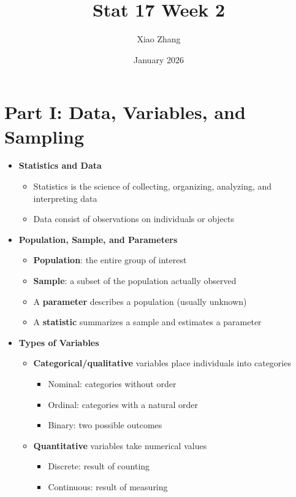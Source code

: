 \documentclass{article}
\title{Stat 17 Week 2}
\author{Xiao Zhang}
\date{January 2026}
\begin{document}
\maketitle

\section*{Part I: Data, Variables, and Sampling}

\begin{itemize}

\item \textbf{Statistics and Data}
\begin{itemize}
  \item Statistics is the science of collecting, organizing, analyzing, and interpreting data
  \item Data consist of observations on individuals or objects
\end{itemize}

\item \textbf{Population, Sample, and Parameters}
\begin{itemize}
  \item \textbf{Population}: the entire group of interest
  \item \textbf{Sample}: a subset of the population actually observed
  \item A \textbf{parameter} describes a population (usually unknown)
  \item A \textbf{statistic} summarizes a sample and estimates a parameter
\end{itemize}

\item \textbf{Types of Variables}
\begin{itemize}
  \item \textbf{Categorical/qualitative} variables place individuals into categories
  \begin{itemize}
    \item Nominal: categories without order
    \item Ordinal: categories with a natural order
    \item Binary: two possible outcomes
  \end{itemize}
  \item \textbf{Quantitative} variables take numerical values
  \begin{itemize}
    \item Discrete: result of counting
    \item Continuous: result of measuring
  \end{itemize}
\end{itemize}


\end{itemize}
\end{document}
